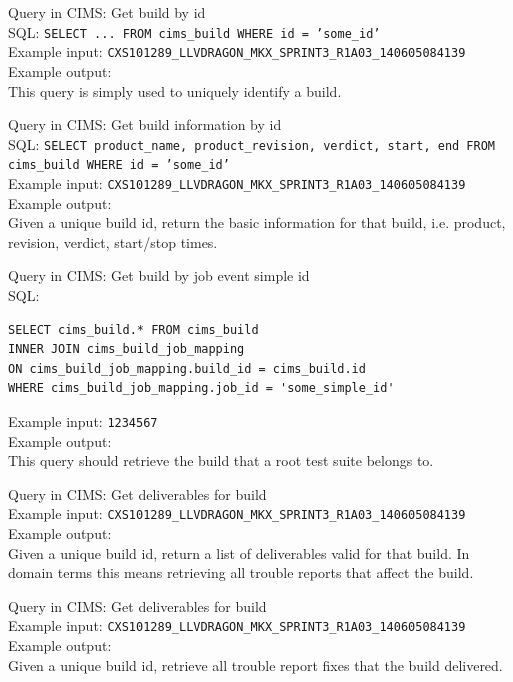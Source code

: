 \label{q:getbuild}
Query in CIMS: Get build by id \\
SQL: {\tt SELECT ... FROM cims\_build WHERE id = 'some\_id'} \\
Example input: {\tt CXS101289\_LLVDRAGON\_MKX\_SPRINT3\_R1A03\_140605084139 } \\
Example output: \\
This query is simply used to uniquely identify a build.

\label{q:getbuildinfo}
Query in CIMS: Get build information by id \\
SQL: {\tt SELECT product\_name, product\_revision, verdict, start, end FROM cims\_build WHERE id = 'some\_id'} \\
Example input: {\tt CXS101289\_LLVDRAGON\_MKX\_SPRINT3\_R1A03\_140605084139 }  \\
Example output: \\
Given a unique build id, return the basic information for that build, i.e. product, revision, verdict, start/stop times.

\label{q:getbuildforroot}
Query in CIMS: Get build by job event simple id \\
SQL: 
\begin{verbatim}
SELECT cims_build.* FROM cims_build
INNER JOIN cims_build_job_mapping
ON cims_build_job_mapping.build_id = cims_build.id   
WHERE cims_build_job_mapping.job_id = 'some_simple_id'
\end{verbatim} 
Example input: {\tt 1234567 }  \\
Example output: \\
This query should retrieve the build that a root test suite belongs to.

\label{q:getrforbuild}
Query in CIMS: Get deliverables for build \\
Example input: {\tt CXS101289\_LLVDRAGON\_MKX\_SPRINT3\_R1A03\_140605084139 }  \\
Example output: \\
Given a unique build id, return a list of deliverables valid for that build. In domain terms this means retrieving all trouble reports that affect the build.

\label{q:getrfixforbuild}
Query in CIMS: Get deliverables for build \\
Example input: {\tt CXS101289\_LLVDRAGON\_MKX\_SPRINT3\_R1A03\_140605084139 }  \\
Example output: \\
Given a unique build id, retrieve all trouble report fixes that the build delivered.

